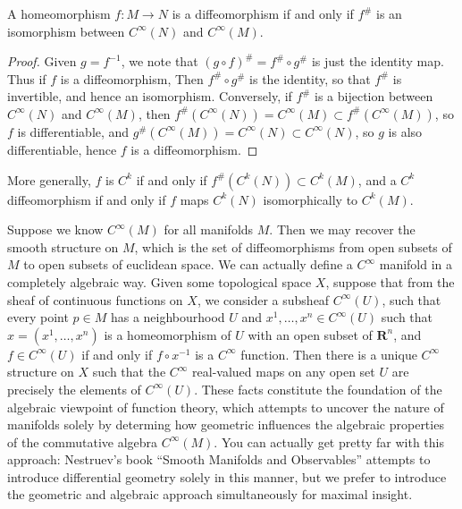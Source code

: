 \begin{theorem}
    A homeomorphism $f:M \to N$ is a diffeomorphism if and only if $f^\#$ is an isomorphism between $C^\infty(N)$ and $C^\infty(M)$.
\end{theorem}
\begin{proof}
    Given $g = f^{-1}$, we note that $(g \circ f)^\# = f^\# \circ g^\#$ is just the identity map. Thus if $f$ is a diffeomorphism, Then $f^\# \circ g^\#$ is the identity, so that $f^\#$ is invertible, and hence an isomorphism. Conversely, if $f^\#$ is a bijection between $C^\infty(N)$ and $C^\infty(M)$, then $f^\#(C^\infty(N)) = C^\infty(M) \subset f^\#(C^\infty(M))$, so $f$ is differentiable, and $g^\#(C^\infty(M)) = C^\infty(N) \subset C^\infty(N)$, so $g$ is also differentiable, hence $f$ is a diffeomorphism.
\end{proof}

\begin{remark}
    More generally, $f$ is $C^k$ if and only if $f^\#(C^k(N)) \subset C^k(M)$, and a $C^k$ diffeomorphism if and only if $f$ maps $C^k(N)$ isomorphically to $C^k(M)$.
\end{remark}

Suppose we know $C^\infty(M)$ for all manifolds $M$. Then we may recover the smooth structure on $M$, which is the set of diffeomorphisms from open subsets of $M$ to open subsets of euclidean space. We can actually define a $C^\infty$ manifold in a completely algebraic way. Given some topological space $X$, suppose that from the sheaf of continuous functions on $X$, we consider a subsheaf $C^\infty(U)$, such that every point $p \in M$ has a neighbourhood $U$ and $x^1, \dots, x^n \in C^\infty(U)$ such that $x = (x^1, \dots, x^n)$ is a homeomorphism of $U$ with an open subset of $\mathbf{R}^n$, and $f \in C^\infty(U)$ if and only if $f \circ x^{-1}$ is a $C^\infty$ function. Then there is a unique $C^\infty$ structure on $X$ such that the $C^\infty$ real-valued maps on any open set $U$ are precisely the elements of $C^\infty(U)$. These facts constitute the foundation of the algebraic viewpoint of function theory, which attempts to uncover the nature of manifolds solely by determing how geometric influences the algebraic properties of the commutative algebra $C^\infty(M)$. You can actually get pretty far with this approach: Nestruev's book ``Smooth Manifolds and Observables'' attempts to introduce differential geometry solely in this manner, but we prefer to introduce the geometric and algebraic approach simultaneously for maximal insight.

